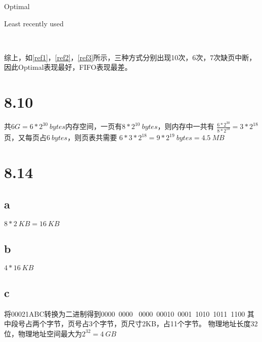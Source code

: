 \documentclass[UTF8]{ctexart}
\begin{document}
    \begin{table}
        \centering
        \caption{Optimal}
        \label{ref2}
        
    \end{table}
    
    \begin{table}
        \centering
        \caption{Least recently used}
        \label{ref3}
        \
    \end{table}
    综上，如\ref{ref1}，\ref{ref2}，\ref{ref3}所示，三种方式分别出现10次，6次，7次缺页中断，
    因此Optimal表现最好，FIFO表现最差。
    \section*{8.10}
    共$6G = 6*2^{30} \  bytes$内存空间，一页有$8*2^{10} \  bytes$，则内存中一共有
    $\frac{6*2^{30}}{8*2^{10}} = 3*2^{18}$页，又每页占$6 \  bytes$，则页表共需要
    $6*3*2^{18} = 9*2^{19} \  bytes = 4.5\ MB$
    \section*{8.14}  
    \subsection*{a}
    $8*2\ KB = 16\ KB$
    \subsection*{b}
    $4*16\ KB$
    \subsection*{c}
    将00021ABC转换为二进制得到0000\ 0000 \ 0000\ 00010\ 0001\ 1010\ 1011\ 1100
    其中段号占两个字节，页号占3个字节，页尺寸2KB，占11个字节。
    物理地址长度32位，物理地址空间最大为$2^{32} = 4\ GB$
\end{document}
